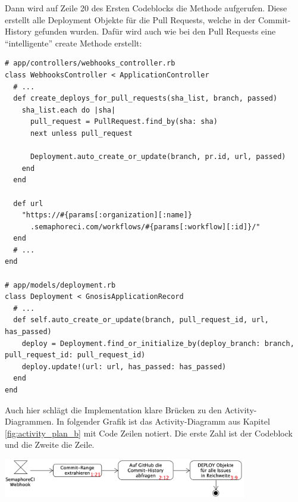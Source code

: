 Dann wird auf Zeile 20 des Ersten Codeblocks die Methode 
aufgerufen. Diese erstellt alle Deployment Objekte für die Pull Requests, welche in der Commit-History gefunden wurden.
Dafür wird auch wie bei den Pull Requests eine \enquote{intelligente} create Methode erstellt:
\begin{codebox}[]
  \begin{verbatim}
# app/controllers/webhooks_controller.rb
class WebhooksController < ApplicationController
  # ...
  def create_deploys_for_pull_requests(sha_list, branch, passed)
    sha_list.each do |sha|
      pull_request = PullRequest.find_by(sha: sha)
      next unless pull_request

      Deployment.auto_create_or_update(branch, pr.id, url, passed)
    end
  end

  def url
    "https://#{params[:organization][:name]}
      .semaphoreci.com/workflows/#{params[:workflow][:id]}/"
  end
  # ...
end

# app/models/deployment.rb
class Deployment < GnosisApplicationRecord
  # ...
  def self.auto_create_or_update(branch, pull_request_id, url, has_passed)
    deploy = Deployment.find_or_initialize_by(deploy_branch: branch, pull_request_id: pull_request_id)
    deploy.update!(url: url, has_passed: has_passed)
  end
end
  \end{verbatim}
\end{codebox}
Auch hier schlägt die Implementation klare Brücken zu den Activity-Diagrammen. In folgender Grafik ist das
Activity-Diagramm aus Kapitel \ref{fig:activity_plan_b} mit Code Zeilen notiert. Die erste Zahl ist der Codeblock und
die Zweite die Zeile.
\begin{center}
  \includegraphics[width=0.8\textwidth]{images/activity/plan_b_code.png}
  \label{fig:activity_plan_b_code}
\end{center}


